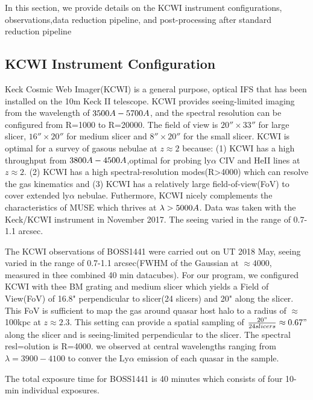 \documentclass[../main.tex]{subfiles}
\begin{document}
	In this section, we provide details on the KCWI instrument configurations, observations,data reduction pipeline, and post-processing after standard reduction pipeline
\subsection{KCWI Instrument Configuration}
Keck Cosmic Web Imager(KCWI) is a general purpose, optical IFS that has been installed on the 10m Keck II telescope. KCWI provides seeing-limited imaging from the wavelength of $3500 \AA - 5700 \AA$, and the spectral resolution can be configured from R=1000 to R=20000. The field of view is $20'' \times 33''$ for large slicer, $16'' \times 20''$ for medium slicer and $8'' \times 20''$ for the small slicer. KCWI is optimal for a survey of gasous nebulae at $z \approx 2$ because: (1) KCWI has a high throughput from $3800 \AA - 4500 \AA$,optimal for probing ly$\alpha$ CIV and HeII lines at $z \approx 2$. (2) KCWI has a high spectral-resolution modes(R>4000) which can resolve the gas kinematics and (3) KCWI has a relatively large field-of-view(FoV) to cover extended ly$\alpha$ nebulae. Futhermore, KCWI nicely complements the characteristics of MUSE which thrives at $\lambda> 5000 \AA$. Data was taken with the Keck/KCWI instrument in November 2017. The seeing varied in the range of 0.7-1.1 arcsec.

The KCWI observations of BOSS1441 were carried out on UT 2018 May, seeing varied in the range of 0.7-1.1 arcsec(FWHM of the Gaussian at $\approx 4000$, measured in thee combined 40 min datacubes). For our program, we configured KCWI with thee BM grating and medium slicer which yields a Field of View(FoV) of 16.8" perpendicular to slicer(24 slicers) and 20" along the slicer. This FoV is sufficient to map the gas around quasar host halo to a radius of $\approx$100kpc at $z \approx 2.3$. This setting can provide a spatial sampling of $\frac{20"}{24 slicers} \approx 0.67"$ along the slicer and is seeing-limited perpendicular to the slicer. The spectral resl=olution is R=4000. we observed at central wavelengths ranging from $\lambda =3900-4100$ to conver the Ly$\alpha$ emission of each quasar in the sample.

The total exposure time for BOSS1441 is 40 minutes which consists of four 10-min individual exposures. 
\end{document}
